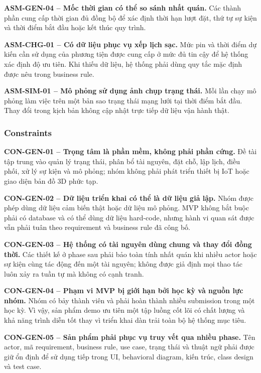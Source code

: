 \medskip
\noindent\textbf{ASM-GEN-04 -- Mốc thời gian có thể so sánh nhất quán.}
Các thành phần cung cấp thời gian đủ đồng bộ để xác định thời hạn lượt đặt, thứ tự sự kiện và thời điểm bắt đầu hoặc kết thúc quy trình.

\medskip
\noindent\textbf{ASM-CHG-01 -- Có dữ liệu phục vụ xếp lịch sạc.}
Mức pin và thời điểm dự kiến cần sử dụng của phương tiện được cung cấp ở mức đủ tin cậy để hệ thống xác định độ ưu tiên. Khi thiếu dữ liệu, hệ thống phải dùng quy tắc mặc định được nêu trong business rule.

\medskip
\noindent\textbf{ASM-SIM-01 -- Mô phỏng sử dụng ảnh chụp trạng thái.}
Mỗi lần chạy mô phỏng làm việc trên một bản sao trạng thái mạng lưới tại thời điểm bắt đầu. Thay đổi trong kịch bản không cập nhật trực tiếp dữ liệu vận hành thật.

\subsubsection*{Constraints}

\noindent\textbf{CON-GEN-01 -- Trọng tâm là phần mềm, không phải phần cứng.}
Đề tài tập trung vào quản lý trạng thái, phân bổ tài nguyên, đặt chỗ, lập lịch, điều phối, xử lý sự kiện và mô phỏng; nhóm không phải phát triển thiết bị IoT hoặc giao diện bản đồ 3D phức tạp.

\medskip
\noindent\textbf{CON-GEN-02 -- Dữ liệu triển khai có thể là dữ liệu giả lập.}
Nhóm được phép dùng dữ liệu cảm biến thật hoặc dữ liệu mô phỏng. MVP không bắt buộc phải có database và có thể dùng dữ liệu hard-code, nhưng hành vi quan sát được vẫn phải tuân theo requirement và business rule đã công bố.

\medskip
\noindent\textbf{CON-GEN-03 -- Hệ thống có tài nguyên dùng chung và thay đổi đồng thời.}
Các thiết kế ở phase sau phải bảo toàn tính nhất quán khi nhiều actor hoặc sự kiện cùng tác động đến một tài nguyên; không được giả định mọi thao tác luôn xảy ra tuần tự mà không có cạnh tranh.

\medskip
\noindent\textbf{CON-GEN-04 -- Phạm vi MVP bị giới hạn bởi học kỳ và nguồn lực nhóm.}
Nhóm có bảy thành viên và phải hoàn thành nhiều submission trong một học kỳ. Vì vậy, sản phẩm demo ưu tiên một tập luồng cốt lõi có chất lượng và khả năng trình diễn tốt thay vì triển khai dàn trải toàn bộ hệ thống mục tiêu.

\medskip
\noindent\textbf{CON-GEN-05 -- Sản phẩm phải phục vụ truy vết qua nhiều phase.}
Tên actor, mã requirement, business rule, use case, trạng thái và thuật ngữ phải được giữ ổn định để sử dụng tiếp trong UI, behavioral diagram, kiến trúc, class design và test case.

